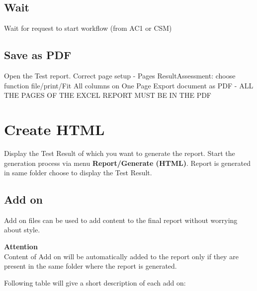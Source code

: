 \subsection{Wait}
Wait for request to start workflow (from AC1 or CSM)




\subsection{Save as PDF}
Open the Test report.\newline
Correct page setup\newline
- Pages ResultAssessment: choose function file/print/Fit All columns on One Page\newline
Export document as PDF\newline
- ALL THE PAGES OF THE EXCEL REPORT MUST BE IN THE PDF\newline

\clearpage


\section{Create HTML}
Display the Test Result of which you want to generate the report.\newline
Start the generation process via menu \textbf{Report/Generate (HTML)}.
Report is generated in same folder choose to display the Test Result.\newline

\subsection{Add on}
Add on files can be used to add content to the final report without worrying about style.

 \begin{tcolorbox}[colframe=white!100!black, colback=red!50!white, sharp corners=all]
 \textbf{Attention}\\
Content of Add on will be automatically added to the report only if they are present in the same folder where the report is generated.
\end{tcolorbox}
Following table will give a short description of each add on:\newline
\newline
{}
\clearpage




